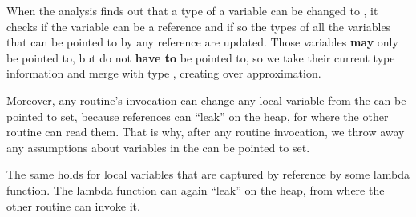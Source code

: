         When the analysis finds out that a type of a variable can 
        be changed to , it checks if the variable can be 
        a reference and if so the types of all the variables that 
        can be pointed to by any reference are updated. Those variables 
        \textbf{may} only be pointed to, but do not \textbf{have to} 
        be pointed to, so we take their current type information 
        and merge with type , creating over approximation.
        
        Moreover, any routine's invocation can change any local 
        variable from the can be pointed to set, because 
        references can ``leak'' on the heap, for where 
        the other routine can read them. That is why, after any routine 
        invocation, we throw away any assumptions about variables 
        in the can be pointed to set.
        
        The same holds for local variables that are captured by 
        reference by some lambda function. The lambda function can 
        again ``leak'' on the heap, from where the other routine 
        can invoke it.
        
        
        
